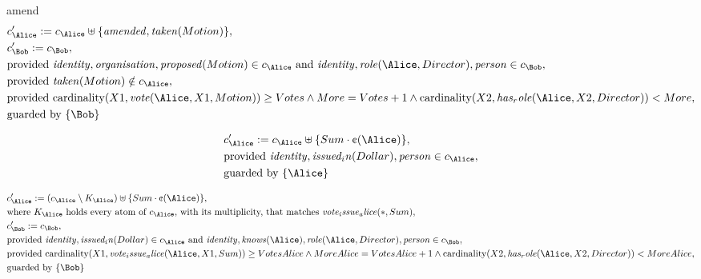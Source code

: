amend
\fi
\begin{align*}
&
c'_
{
\Alice
}
 := 
c_
{
\Alice
}
 \uplus 
\{
\mathit{
amended
}
,
\mathit{
taken
}
(
Motion
)
\}
,\\
&
c'_
{
\Bob
}
 := 
c_
{
\Bob
}
,\\
&
\text{provided } 
\mathit{
identity
}
,
\mathit{
organisation
}
,
\mathit{
proposed
}
(
Motion
)
 \in c_
{
\Alice
}
 \text{ and } 
\mathit{
identity
}
,
\mathit{
role
}
(
\Alice
,
Director
)
,
\mathit{
person
}
 \in c_
{
\Bob
}
,\\
&
\text{provided } 
\mathit{
taken
}
(
Motion
)
 \notin c_
{
\Alice
}
,\\
&
\text{provided } 
\mathrm{cardinality}(
X1
,
\mathit{
vote
}
(
\Alice
,
X1
,
Motion
)
)
\ge
Votes
\land
More
=
Votes
+
1
\land
\mathrm{cardinality}(
X2
,
\mathit{
has_role
}
(
\Alice
,
X2
,
Director
)
)
<
More
,\\
&
\text{guarded by } \{
\Bob
\}
\end{align*}

\begin{align*}
&
c'_
{
\Alice
}
 := 
c_
{
\Alice
}
 \uplus 
\{
Sum
\cdot
\text{\textcent}
(
\Alice
)
\}
,\\
&
\text{provided } 
\mathit{
identity
}
,
\mathit{
issued_in
}
(
Dollar
)
,
\mathit{
person
}
 \in c_
{
\Alice
}
,\\
&
\text{guarded by } \{
\Alice
\}
\end{align*}

\begin{align*}
&
c'_
{
\Alice
}
 := 
(
c_
{
\Alice
}
 \setminus K_
{
\Alice
}
) \uplus 
\{
Sum
\cdot
\text{\textcent}
(
\Alice
)
\}
,\\
&
\text{where } K_
{
\Alice
}
 \text{ holds every atom of } c_
{
\Alice
}
 \text{, with its multiplicity, that matches } 
\mathit{
vote_issue_alice
}
(
\ast
,
Sum
)
,\\
&
c'_
{
\Bob
}
 := 
c_
{
\Bob
}
,\\
&
\text{provided } 
\mathit{
identity
}
,
\mathit{
issued_in
}
(
Dollar
)
 \in c_
{
\Alice
}
 \text{ and } 
\mathit{
identity
}
,
\mathit{
knows
}
(
\Alice
)
,
\mathit{
role
}
(
\Alice
,
Director
)
,
\mathit{
person
}
 \in c_
{
\Bob
}
,\\
&
\text{provided } 
\mathrm{cardinality}(
X1
,
\mathit{
vote_issue_alice
}
(
\Alice
,
X1
,
Sum
)
)
\ge
VotesAlice
\land
MoreAlice
=
VotesAlice
+
1
\land
\mathrm{cardinality}(
X2
,
\mathit{
has_role
}
(
\Alice
,
X2
,
Director
)
)
<
MoreAlice
,\\
&
\text{guarded by } \{
\Bob
\}
\end{align*}
